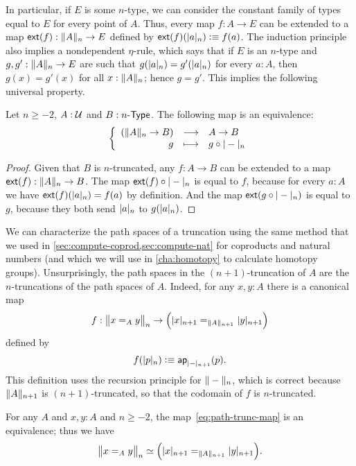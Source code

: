 In particular, if $E$ is some $n$-type, we can consider the constant family of types equal to $E$ for every point of $A$.
Thus, every map $f:A\to{}E$ can be extended to a map $\extend{f}:\trunc nA\to{}E$ defined by $\extend{f}(\tproj na)\defeq f(a)$.
The induction principle also implies a nondependent $\eta$-rule, which says that if $E$ is an $n$-type and $g,g':\trunc nA\to{}E$ are such
that $g(\tproj na)=g'(\tproj na)$ for every $a:A$, then $g(x)=g'(x)$ for all $x:\trunc nA$; hence $g=g'$.
This implies the following universal property.

\begin{lem}\label{thm:trunc-reflective}
  Let $n\ge-2$, $A:\type$ and $B:\typele{n}$. The following map is an
  equivalence:
  \[\function{(\trunc nA\to{}B)}{A\to{}B}{g}{g\circ\tprojf n}\]
\end{lem}

\begin{proof}
  Given that $B$ is $n$-truncated, any $f:A\to{}B$ can be extended to a map $\extend{f}:\trunc nA\to{}B$.
  The map $\extend{f}\circ\tprojf n$ is equal to $f$, because for every $a:A$ we have $\extend{f}(\tproj na)=f(a)$ by definition.
  And the map $\extend{g\circ\tprojf n}$ is equal to $g$, because they both send $\tproj na$ to $g(\tproj na)$.
\end{proof}

We can characterize the path spaces of a truncation using the same method that we used in \autoref{sec:compute-coprod,sec:compute-nat} for
coproducts and natural numbers (and which we will use in \autoref{cha:homotopy} to calculate homotopy groups).
Unsurprisingly, the path spaces in the $(n+1)$-truncation of $A$ are the $n$-truncations of the path spaces of $A$.
Indeed, for any $x,y:A$ there is a canonical map
\begin{equation}
  f:\ttrunc n{x=_Ay}\to \Big(\tproj {n+1}x=_{\trunc{n+1}A}\tproj {n+1}y\Big)\label{eq:path-trunc-map}
\end{equation}
defined by
\[f(\tproj n{p})\defeq \apfunc{\tproj {n+1}-}(p). \]
This definition uses the recursion principle for $\trunc n-$, which is correct because $\trunc {n+1}A$ is $(n+1)$-truncated, so that the
codomain of $f$ is $n$-truncated.

\begin{thm} \label{thm:path-truncation}
  For any $A$ and $x,y:A$ and $n\ge -2$, the map~\eqref{eq:path-trunc-map} is an equivalence; thus we have
  \[ \eqv{\ttrunc n{x=_Ay}}{\Big(\tproj {n+1}x=_{\trunc{n+1}A}\tproj {n+1}y\Big)}. \]
\end{thm}

